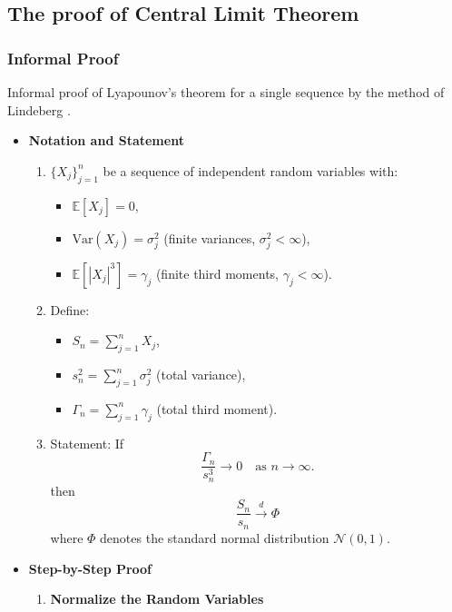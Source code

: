 \newpage
\subsection{The proof of Central Limit Theorem}
\subsubsection{Informal Proof}
Informal proof of Lyapounov's theorem for a single sequence by the method of Lindeberg \cite{chung2000course}.
\begin{itemize}
    \item \textbf{Notation and Statement}
    \begin{enumerate}
    \item \( \{X_j\}_{j=1}^n \) be a sequence of independent random variables with:
    \begin{itemize}
        \item[] \( \mathbb{E}[X_j] = 0 \), 
        \item[] \( \text{Var}(X_j) = \sigma_j^2 \) (finite variances, \( \sigma_j^2 < \infty \)),
        \item[] \( \mathbb{E}[|X_j|^3] = \gamma_j \) (finite third moments, \( \gamma_j < \infty \)).
    \end{itemize}

        \item Define:
        \begin{itemize}
            \item[] \( S_n = \sum_{j=1}^n X_j \),
            \item[] \( s_n^2 = \sum_{j=1}^n \sigma_j^2 \) (total variance),
            \item[] \( \Gamma_n = \sum_{j=1}^n \gamma_j \) (total third moment).
        \end{itemize}

        \item Statement:
    If 
    \[
   \frac{\Gamma_n}{s_n^3} \to 0 \quad \text{as } n \to \infty.
   \]
   then 
   \[
   \frac{S_n}{s_n} \xrightarrow{d} \Phi
   \]
   where \( \Phi\) denotes the standard normal distribution \( \mathcal{N}(0,1) \).
   
    \end{enumerate}
    \item \textbf{Step-by-Step Proof}
    \begin{enumerate}
        \item \textbf{Normalize the Random Variables}
        

\end{enumerate}
\end{itemize}
